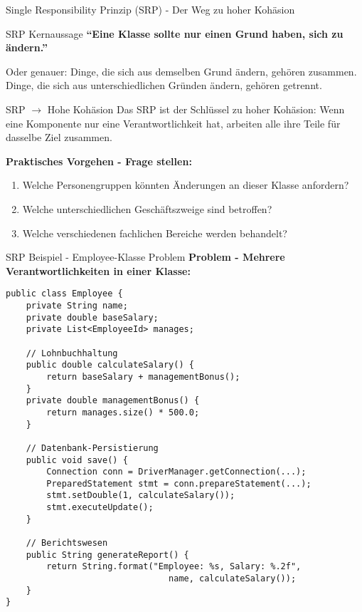 \begin{frame}{Single Responsibility Prinzip (SRP) - Der Weg zu hoher Kohäsion}
  \begin{exampleblock}{SRP Kernaussage}
    \textbf{``Eine Klasse sollte nur einen Grund haben, sich zu ändern.''}

    Oder genauer: Dinge, die sich aus demselben Grund ändern, gehören zusammen.
    Dinge, die sich aus unterschiedlichen Gründen ändern, gehören getrennt.
  \end{exampleblock}

  \begin{alertblock}{SRP $\rightarrow$ Hohe Kohäsion}
    Das SRP ist der Schlüssel zu hoher Kohäsion: Wenn eine Komponente nur eine Verantwortlichkeit hat, arbeiten alle ihre Teile für dasselbe Ziel zusammen.
  \end{alertblock}

  \textbf{Praktisches Vorgehen - Frage stellen:}
  \begin{enumerate}
    \item Welche Personengruppen könnten Änderungen an dieser Klasse anfordern?
    \item Welche unterschiedlichen Geschäftszweige sind betroffen?
    \item Welche verschiedenen fachlichen Bereiche werden behandelt?
  \end{enumerate}
\end{frame}

\begin{frame}[fragile]{SRP Beispiel - Employee-Klasse Problem}
  \textbf{Problem - Mehrere Verantwortlichkeiten in einer Klasse:}
  \begin{lstlisting}[style=java, basicstyle=\tiny\ttfamily]
public class Employee {
    private String name;
    private double baseSalary;
    private List<EmployeeId> manages;

    // Lohnbuchhaltung
    public double calculateSalary() {
        return baseSalary + managementBonus();
    }
    private double managementBonus() {
        return manages.size() * 500.0;
    }

    // Datenbank-Persistierung
    public void save() {
        Connection conn = DriverManager.getConnection(...);
        PreparedStatement stmt = conn.prepareStatement(...);
        stmt.setDouble(1, calculateSalary());
        stmt.executeUpdate();
    }

    // Berichtswesen
    public String generateReport() {
        return String.format("Employee: %s, Salary: %.2f",
                                name, calculateSalary());
    }
}
  \end{lstlisting}
\end{frame}

